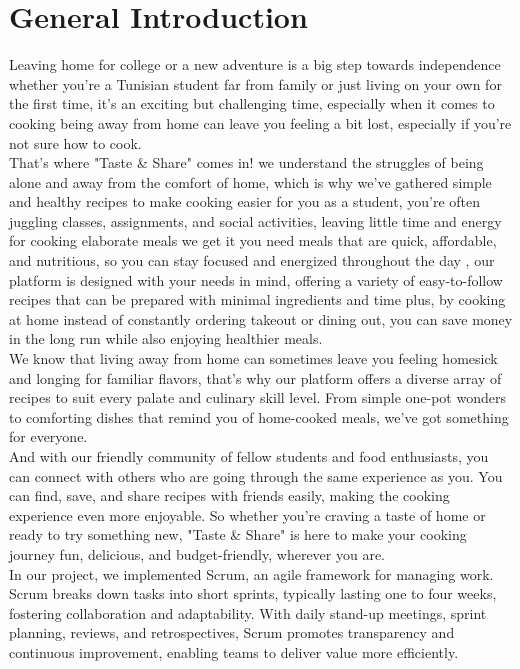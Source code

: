 \documentclass{article}
\begin{document}
\section*{ \Huge General Introduction}\vspace{0.5cm} 
\hspace{1.5em}Leaving home for college or a new adventure is a big step towards independence whether you're a Tunisian student far from family or just living on your own for the first time, it's an exciting but challenging time, especially when it comes to cooking being away from home can leave you feeling a bit lost, especially if you're not sure how to cook.\vspace{0.2cm} \\ 
That's where "Taste \& Share" comes in! we understand the struggles of being alone and away from the comfort of home, which is why we've gathered simple and healthy recipes to make cooking easier for you as a student, you're often juggling classes, assignments, and social activities, leaving little time and energy for cooking elaborate meals we get it you need meals that are quick, affordable, and nutritious, so you can stay focused and energized throughout the day , our platform is designed with your needs in mind, offering a variety of easy-to-follow recipes that can be prepared with minimal ingredients and time plus, by cooking at home instead of constantly ordering takeout or dining out, you can save money in the long run while also enjoying healthier meals.\vspace{0.2cm}\\ We know that living away from home can sometimes leave you feeling homesick and longing for familiar flavors, that's why our platform offers a diverse array of recipes to suit every palate and culinary skill level. From simple one-pot wonders to comforting dishes that remind you of home-cooked meals, we've got something for everyone.\vspace{0.2cm}\\And with our friendly community of fellow students and food enthusiasts, you can connect with others who are going through the same experience as you. You can find, save, and share recipes with friends easily, making the cooking experience even more enjoyable. So whether you're craving a taste of home or ready to try something new, "Taste \& Share" is here to make your cooking journey fun, delicious, and budget-friendly, wherever you are.
\vspace{0.2cm}\\In our project, we implemented Scrum, an agile framework for managing work. Scrum breaks down tasks into short sprints, typically lasting one to four weeks, fostering collaboration and adaptability. With daily stand-up meetings, sprint planning, reviews, and retrospectives, Scrum promotes transparency and continuous improvement, enabling teams to deliver value more efficiently.
\newpage
\end{document}
